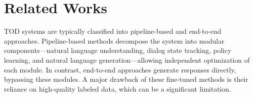 \section{Related Works}

TOD systems are typically classified into pipeline-based and end-to-end approaches. Pipeline-based methods \cite{WILLIAMS2007393, lee-2013-structured, LEE2009466, peng-etal-2020-shot, chen-etal-2019-semantically} decompose the system into modular components—natural language understanding, dialog state tracking, policy learning, and natural language generation—allowing independent optimization of each module. In contrast, end-to-end approaches \cite{hosseini2020simple, madotto-etal-2018-mem2seq, su-etal-2022-multi, mosharrof2023zero, SiddiqueTOD, lei-etal-2018-sequicity, lin-etal-2020-mintl, imrattanatrai-fukuda-2023-end} generate responses directly, bypassing these modules. A major drawback of these fine-tuned methods is their reliance on high-quality labeled data, which can be a significant limitation.

 



